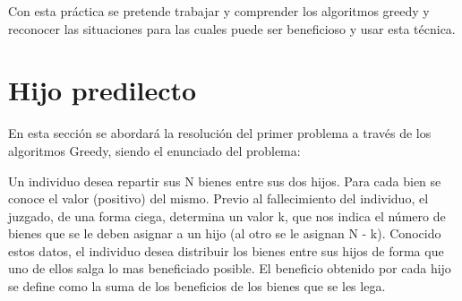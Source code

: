\documentclass[11pt,openany]{book}
\begin{document}
Con esta práctica se pretende trabajar y comprender los algoritmos greedy y  reconocer las situaciones para las cuales puede 
ser beneficioso y usar esta técnica.

\chapter{Hijo predilecto}
En esta sección se abordará la resolución del primer problema a través de los algoritmos Greedy, siendo 
el enunciado del problema:

Un individuo desea repartir sus N bienes entre sus dos hijos. Para cada bien se conoce el
valor (positivo) del mismo. Previo al fallecimiento del individuo, el juzgado, de una forma ciega,
determina un valor k, que nos indica el número de bienes que se le deben asignar a un hijo (al
otro se le asignan N - k). Conocido estos datos, el individuo desea distribuir los bienes entre
sus hijos de forma que uno de ellos salga lo mas beneficiado posible. El beneficio obtenido por
cada hijo se define como la suma de los beneficios de los bienes que se les lega.
\end{document}
